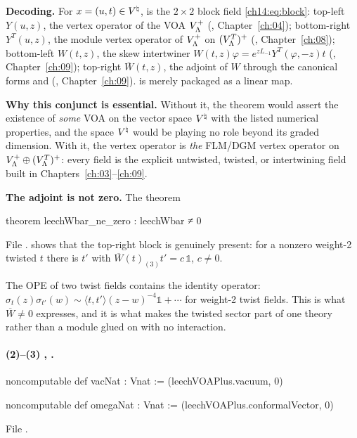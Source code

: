 \begin{dictionary}
\textbf{Decoding.}  For $x=(u,t)\in{V^{\natural}}$,  is the $2\times2$ block field
\eqref{ch14:eq:block}: top-left $Y(u,z)$, the vertex operator of the VOA $V_{\Lambda}^+$ (,
Chapter~\ref{ch:04}); bottom-right $Y^T(u,z)$, the module vertex operator of $V_{\Lambda}^+$ on
$(V_{\Lambda}^T)^+$ (, Chapter~\ref{ch:08}); bottom-left $W(t,z)$, the skew intertwiner
$W(t,z)\varphi=e^{zL_{-1}}Y^T(\varphi,-z)t$ (, Chapter~\ref{ch:09}); top-right $\overline W(t,z)$, the
adjoint of $W$ through the canonical forms  and  (, Chapter~\ref{ch:09}).
 is merely  packaged as a linear map.

\textbf{Why this conjunct is essential.}  Without it, the theorem would assert the existence of
\emph{some} VOA on the vector space ${V^{\natural}}$ with the listed numerical properties, and the space
${V^{\natural}}$ would be playing no role beyond its graded dimension.  With it, the vertex operator is
\emph{the} FLM/DGM vertex operator on $V_{\Lambda}^+\oplus(V_{\Lambda}^T)^+$: every field is the explicit
untwisted, twisted, or intertwining field built in Chapters~\ref{ch:03}--\ref{ch:09}.

\textbf{The adjoint is not zero.}  The theorem
\begin{leancode}
theorem leechWbar_ne_zero : leechWbar ≠ 0
\end{leancode}
File .
shows that the top-right block is genuinely present: for a nonzero weight-2 twisted $t$ there is $t'$ with
$\overline W(t)_{(3)}t'=c\,\mathbb 1$, $c\ne0$.
\end{dictionary}

\begin{physics}
The OPE of two twist fields contains the identity operator: $\sigma_t(z)\sigma_{t'}(w)\sim
\langle t,t'\rangle(z-w)^{-4}\mathbb 1+\cdots$ for weight-2 twist fields.  This is what
$\overline W\neq0$ expresses, and it is what makes the twisted sector part of one theory rather than a module
glued on with no interaction.
\end{physics}

\paragraph{(2)--(3) , .}
\begin{leancode}
noncomputable def vacNat : Vnat := (leechVOAPlus.vacuum, 0)

noncomputable def omegaNat : Vnat := (leechVOAPlus.conformalVector, 0)
\end{leancode}
File .

